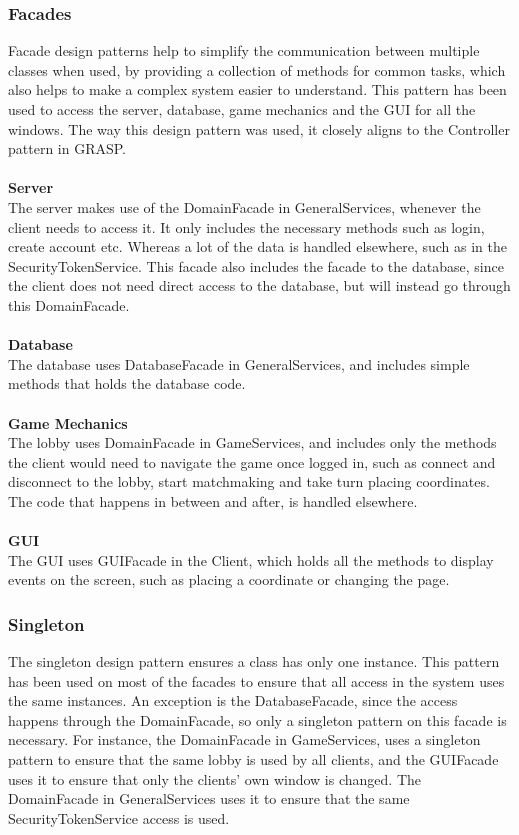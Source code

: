			\subsubsection{Facades}
Facade design patterns help to simplify the communication between multiple
classes when used, by providing a collection of methods for common tasks,
 which also helps to make a complex system easier to understand. This pattern
 has been used to access the server, database, game mechanics and the GUI for all the windows.
The way this design pattern was used, it closely aligns to the Controller pattern in GRASP.
\\
\\
\textbf{Server}
\\
The server makes use of the DomainFacade in GeneralServices, whenever the
client needs to access it. It only includes the necessary methods such as
login, create account etc. Whereas a lot of the data is handled elsewhere,
 such as in the SecurityTokenService. This facade also includes the facade
 to the database, since the client does not need direct access to the database,
  but will instead go through this DomainFacade.
\\
\\
\textbf{Database}
\\
The database uses DatabaseFacade in GeneralServices, and includes simple
methods that holds the database code.
\\
\\
\textbf{Game Mechanics}
\\
The lobby uses DomainFacade in GameServices, and includes only the methods
the client would need to navigate the game once logged in, such as connect
and disconnect to the lobby, start matchmaking and take turn placing
 coordinates. The code that happens in between and after, is handled elsewhere.
\\
\\
\textbf{GUI}
\\
The GUI uses GUIFacade in the Client, which holds all the methods to
display events on the screen, such as placing a coordinate or changing the page.
			\subsubsection{Singleton}
The singleton design pattern ensures a class has only one instance.
This pattern has been used on most of the facades to ensure that all access
 in the system uses the same instances. An exception is the DatabaseFacade,
  since the access happens through the DomainFacade, so only a singleton
	 pattern on this facade is necessary.
For instance, the DomainFacade in GameServices, uses a singleton pattern
to ensure that the same lobby is used by all clients, and the GUIFacade uses
 it to ensure that only the clients’ own window is changed. The DomainFacade
  in GeneralServices uses it to ensure that the same SecurityTokenService access is used.
